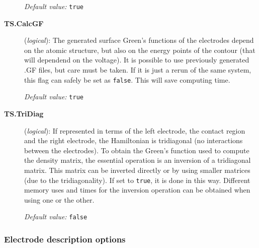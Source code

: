 \documentclass[11pt]{article}
\begin{document}
\begin{description}
{\it Default value:} {\tt true}

\item[{\bf TS.CalcGF}] ({\it logical}): 
The generated surface Green's functions of the electrodes depend on the atomic structure,
but also on the energy points of the contour (that will dependend on the voltage). 
It is possible to use previously generated .GF files, but care must be taken.
If it is just a rerun of the same system, this flag can safely be set as {\tt false}. 
This will save computing time.

{\it Default value:} {\tt true}

\item[{\bf TS.TriDiag}] ({\it logical}):  If represented in terms of the left electrode, the
  contact region and the right electrode, the Hamiltonian is
  tridiagonal (no interactions between the electrodes). To obtain the
  Green's function used to compute the density matrix, the essential
  operation is an inversion of a tridiagonal matrix. This matrix can
  be inverted directly or by using smaller matrices (due to the
  tridiagonality). If set to {\tt true}, it is done in this way.
  Different memory uses and times for the inversion operation can be
  obtained when using one or the other.

{\it Default value:} {\tt false}

\end{description}

\subsubsection{Electrode description options}
\end{document}
